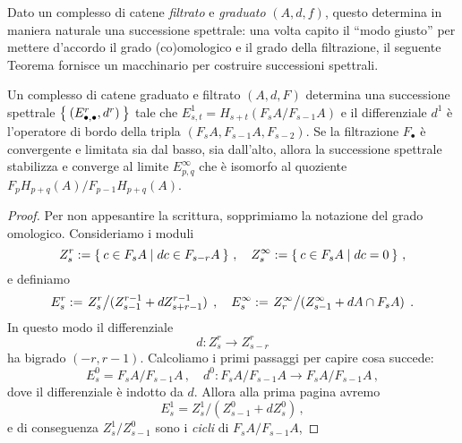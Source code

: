 


Dato un complesso di catene \emph{filtrato} e \emph{graduato} $(A,d,f)$,
questo determina in maniera naturale una successione spettrale:
una volta capito il ``modo giusto'' per mettere d'accordo il grado
(co)omologico e il grado della filtrazione, il seguente Teorema
fornisce un macchinario per costruire successioni spettrali.

\begin{thm}\label{SS-machine}
	Un complesso di catene graduato e filtrato $(A,d,F)$ determina una successione spettrale
	$\Set{(E_{\bullet,\bullet}^{r},d^{r})}$ tale che
	$E_{s,t}^{1} = H_{s+t}(F_{s}A/F_{s-1}A)$ e il differenziale $d^{1}$ è
	l'operatore di bordo della tripla $(F_{s}A,F_{s-1}A,F_{s-2})$.
	Se la filtrazione $F_{\bullet}$ è convergente e limitata sia dal basso, sia dall'alto,
	allora la successione spettrale stabilizza e converge al limite $E^{\infty}_{p,q}$
	che è isomorfo al quoziente $F_{p}H_{p+q}(A)/F_{p-1}H_{p+q}(A)$.
	\begin{proof}
		Per non appesantire la scrittura, 
		sopprimiamo la notazione del grado omologico.
		Consideriamo i moduli
		\begin{equation*}
			Z_{s}^{r} := \Set{c \in F_{s}A | dc \in F_{s-r}A}\,,
			\quad Z_{s}^{\infty} := \Set{c \in F_{s}A | dc = 0}\,,
		\end{equation*}
		e definiamo
		\begin{equation*}
			E^{r}_{s} := \left. Z_{s}^{r} \middle/ (Z_{s-1}^{r-1} + dZ^{r-1}_{s+r-1}) \right. \,,
			\quad E^{\infty}_{s} := \left. Z^{\infty}_{r} \middle/ (Z_{s-1}^{\infty} + dA \cap F_{s}A) \right. \,.
		\end{equation*}
		In questo modo il differenziale
		\begin{equation*}
			d: Z^{r}_{s} \longrightarrow Z_{s-r}^{r}
		\end{equation*}
		ha bigrado $(-r,r-1)$. 
		Calcoliamo i primi passaggi per capire cosa succede:
		\begin{equation*}
			E_{s}^{0} = F_{s}A/F_{s-1}A\,, \quad
			d^{0}: F_{s}A/F_{s-1}A \longrightarrow F_{s}A/F_{s-1}A\,,
		\end{equation*}
		dove il differenziale è indotto da $d$. Allora alla prima pagina avremo
		\begin{equation*}
			E_{s}^{1} = Z_{s}^{1}/(Z_{s-1}^{0} + dZ_{s}^{0})\,,
		\end{equation*}
		e di conseguenza $Z^{1}_{s}/Z^{0}_{s-1}$ sono i \emph{cicli} di $F_{s}A/F_{s-1}A$,

\end{proof}
\end{thm}
